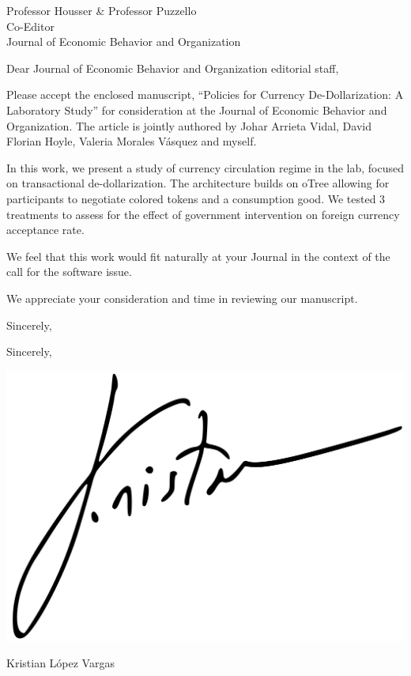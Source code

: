 \documentclass[ucsb,cs,12pt]{ucletter}
\begin{document}
\begin{letter}{
    Professor Housser \& Professor Puzzello\\
    Co-Editor \\
    Journal of Economic Behavior and Organization \\
}

\opening{Dear  Journal of Economic Behavior and Organization editorial staff,}

Please accept the enclosed manuscript, “Policies for Currency De-Dollarization: A Laboratory Study” for consideration at the  Journal of Economic Behavior and Organization. The article is jointly authored by Johar Arrieta Vidal, David Florian Hoyle, Valeria Morales Vásquez and myself.

In this work, we present a study of currency circulation regime in the lab, focused on transactional de-dollarization. The architecture builds on oTree allowing for participants to negotiate colored tokens and a consumption good. We tested 3 treatments to assess for the effect of government intervention on foreign currency acceptance rate.


We feel that this work would fit naturally at your Journal in the context of the call for the software issue. 

We appreciate your consideration and time in reviewing our manuscript.

Sincerely,



\vspace{0.2 cm}
Sincerely, 
\vspace{0.2 cm}

\includegraphics[height=5\baselineskip]{Signature_kl.png}

Kristian L\'opez Vargas


\end{letter}
\end{document}
